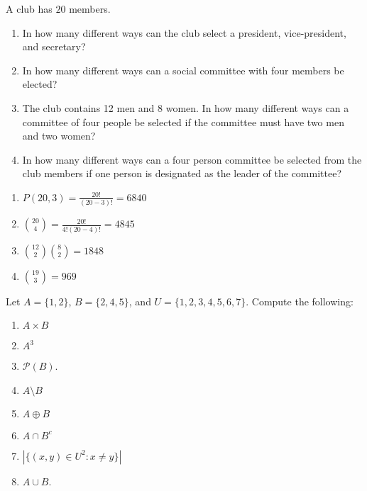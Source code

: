         \begin{problem}
            A club has $20$ members.
            \begin{enumerate}
                \item   In how many different ways can the club select a president,
                        vice-president, and secretary?
                \item   In how many different ways can a social committee with four
                        members be elected?
                \item   The club contains 12 men and 8 women. In how many different
                        ways can a committee of four people be selected if the
                        committee must have two men and two women?
                \item   In how many different ways can a four person committee be
                        selected from the club members if one person is designated
                        as the leader of the committee?
            \end{enumerate}
        \end{problem}
        \begin{solution}
            \par
            \begin{enumerate}
                \item $P(20,3) = \frac{20!}{(20-3)!} = 6840$
                \item $\binom{20}{4} = \frac{20!}{4!(20-4)!} = 4845$
                \item $\binom{12}{2}\binom{8}{2} = 1848$
                \item $\binom{19}{3} = 969$
            \end{enumerate}
        \end{solution}
        \begin{problem}
            Let $A = \{1,2\}$, $B = \{2,4,5\}$, and $U = \{1,2,3,4,5,6,7\}$. Compute
            the following:
            \begin{enumerate}
                \item $A\times B$
                \item $A^3$
                \item $\mathcal{P}(B)$.
                \item $A\setminus B$
                \item $A \oplus B$
                \item $A\cap B^c$
                \item $|\{(x,y)\in U^2:x\ne y\}|$
                \item $A\cup B$.
            \end{enumerate}
        \end{problem}

